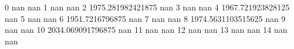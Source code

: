 0 nan nan
1 nan nan
2 1975.281982421875 nan
3 nan nan
4 1967.721923828125 nan
5 nan nan
6 1951.7216796875 nan
7 nan nan
8 1974.5631103515625 nan
9 nan nan
10 2034.069091796875 nan
11 nan nan
12 nan nan
13 nan nan
14 nan nan
